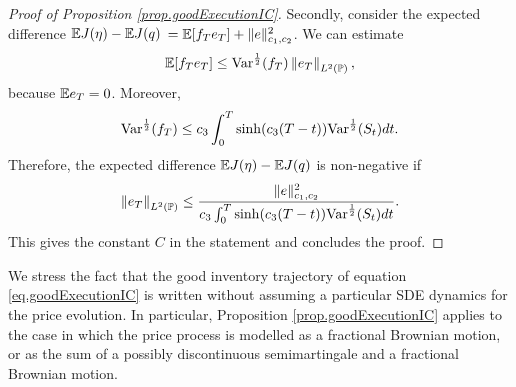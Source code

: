 \documentclass[10pt,a4paper]{article}
\begin{document}
\begin{proof}[Proof of Proposition \ref{prop.goodExecutionIC}]
Secondly, consider the   expected difference $\Expectation \costFunctional (\eta) - \Expectation \costFunctional (\inventory)$ $=\Expectation[f_\timeHorizon e_\timeHorizon] + \normInventoryTrjectories{e}\squared$. We can estimate
\begin{equation*}
\Expectation[f_\timeHorizon e_\timeHorizon] \leq \Variance^{\half}(f_\timeHorizon)\norm[e_\timeHorizon]_{\Ltwo(\Prob)},
\end{equation*}
because $\Expectation e_\timeHorizon = 0$. Moreover, 
\begin{equation*}
\Variance^{\half}(f_\timeHorizon)
\leq \ratioAversionOverImpact \intZeroTimeHorizon \sinh(\ratioAversionOverImpact(\timeHorizon - t))\Variance^{\half}(\fundamentalPrice_t) dt. 
\end{equation*} 
Therefore, the   expected difference $\Expectation \costFunctional (\eta) - \Expectation \costFunctional (\inventory)$ is non-negative if 
\begin{equation*}
\norm[e_\timeHorizon]_{\Ltwo(\Prob)} \leq 
\frac{ \normInventoryTrjectories{e}\squared }{\ratioAversionOverImpact \intZeroTimeHorizon \sinh(\ratioAversionOverImpact(\timeHorizon - t))\Variance^{\half}(\fundamentalPrice_t) dt}.
\end{equation*}
This gives the constant $C$ in the statement and concludes the proof.
\end{proof}
\begin{remark}
We stress the fact that the good inventory trajectory of equation \eqref{eq.goodExecutionIC} is written without assuming a particular SDE dynamics for the price evolution. In particular, Proposition \ref{prop.goodExecutionIC} applies to the case in which the price process is modelled as a fractional Brownian motion, or as the sum of a possibly discontinuous semimartingale and a fractional Brownian motion. 
\end{remark}
\end{document}
